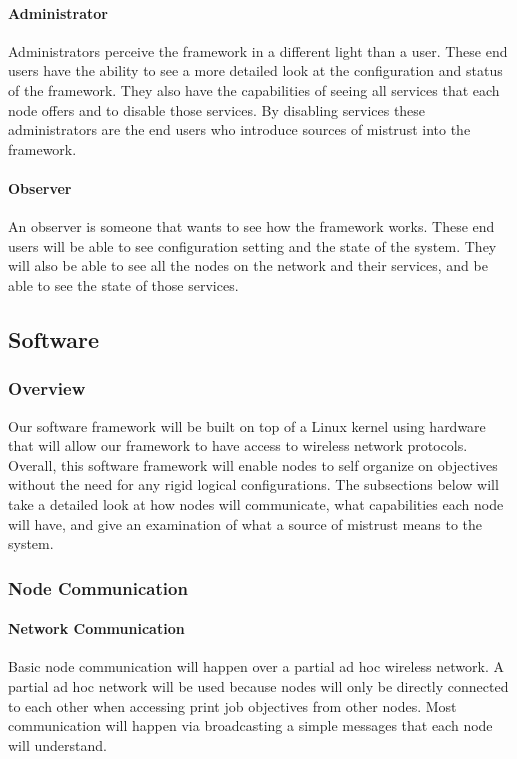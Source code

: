 \documentclass[draftclsnofoot, onecolumn, compsoc, 10pt]{IEEEtran}
\begin{document}
\paragraph{Administrator}
Administrators perceive the framework in a different light than a user. These end users have the ability to see a more detailed look at the configuration and status of the framework. They also have the capabilities of seeing all services that each node offers and to disable those services. By disabling services these administrators are the end users who introduce sources of mistrust into the framework.

\paragraph{Observer}
An observer is someone that wants to see how the framework works. These end users will be able to see configuration setting and the state of the system. They will also be able to see all the nodes on the network and their services, and be able to see the state of those services.

\subsection{Software}
\subsubsection{Overview}
Our software framework will be built on top of a Linux kernel using hardware that will allow our framework to have access to wireless network protocols. Overall, this software framework will enable nodes to self organize on objectives without the need for any rigid logical configurations. The subsections below will take a detailed look at how nodes will communicate, what capabilities each node will have, and give an examination of what a source of mistrust means to the system.

\subsubsection{Node Communication}
\paragraph{Network Communication}
Basic node communication will happen over a partial ad hoc wireless network. A partial ad hoc network will be used because nodes will only be directly connected to each other when accessing print job objectives from other nodes. Most communication will happen via broadcasting a simple messages that each node will understand.
\end{document}
